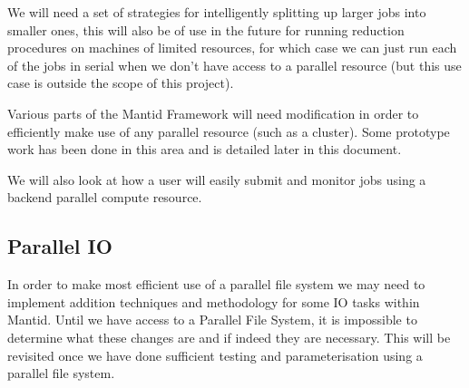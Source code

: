 We will need a set of strategies for intelligently splitting up larger jobs into smaller ones, this will also be of use in the future for running reduction procedures on machines of limited resources, for which case we can just run each of the jobs in serial when we don't have access to a parallel resource (but this use case is outside the scope of this project).

Various parts of the Mantid Framework will need modification in order to efficiently make use of any parallel resource (such as a cluster).  Some prototype work has been done in this area and is detailed later in this document.

We will also look at how a user will easily submit and monitor jobs using a backend parallel compute resource.






\subsection{Parallel IO}

In order to make most efficient use of a parallel file system we may need to implement addition techniques and methodology for some IO tasks within Mantid.  Until we have access to a Parallel File System, it is impossible to determine what these changes are and if indeed they are necessary.  
This will be revisited once we have done sufficient testing and parameterisation using a parallel file system.

